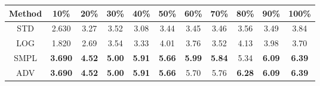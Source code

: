 \documentclass{standalone}
\begin{document}
\begin{tabular}{c|cccccccccc}
      \toprule
      Method & 10\% & 20\% & 30\% & 40\% & 50\% & 60\% & 70\% & 80\% & 90\% & 100\% \\
      \midrule
STD & 2.630 & 3.27 & 3.52 & 3.08 & 3.44 & 3.45 & 3.46 & 3.56 & 3.49 & 3.84\\
LOG & 1.820 & 2.69 & 3.54 & 3.33 & 4.01 & 3.76 & 3.52 & 4.13 & 3.98 & 3.70\\
SMPL & \textbf{3.690} & \textbf{4.52} & \textbf{5.00} & \textbf{5.91} & \textbf{5.66} & \textbf{5.99} & \textbf{5.84} & 5.34 & \textbf{6.09} & \textbf{6.39}\\
ADV & \textbf{3.690} & \textbf{4.52} & \textbf{5.00} & \textbf{5.91} & \textbf{5.66} & 5.70 & 5.76 & \textbf{6.28} & \textbf{6.09} & \textbf{6.39}\\
  \bottomrule
\end{tabular}
\end{document}
